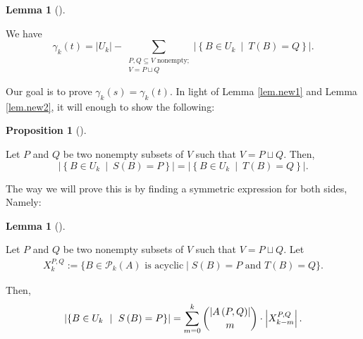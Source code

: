 \documentclass[numbers=enddot,12pt,final,onecolumn,notitlepage]{scrartcl}%
\theoremstyle{definition}
\newtheorem{lem}[theo]{Lemma}
\newenvironment{lemma}[1][]
{\begin{lem}[#1]\begin{leftbar}}
{\end{leftbar}\end{lem}}
\newtheorem{prop}[theo]{Proposition}
\newenvironment{proposition}[1][]
{\begin{prop}[#1]\begin{leftbar}}
{\end{leftbar}\end{prop}}
\let\sumnonlimits\sum
\renewcommand{\sum}{\sumnonlimits\limits}
\theoremstyle{plainsl}
\begin{document}
\begin{lemma}
\label{lem.new2}We have%
\[
\gamma_{k}\left(  t\right)  =\left\vert U_{k}\right\vert -\sum
_{\substack{P,Q\subseteq V\text{ nonempty;}\\V=P\sqcup Q}}\left\vert \left\{
B\in U_{k}\ \mid\ T\left(  B\right)  =Q\right\}  \right\vert .
\]

\end{lemma}

Our goal is to prove $\gamma_{k}\left(  s\right)  =\gamma_{k}\left(  t\right)
$. In light of Lemma \ref{lem.new1} and Lemma \ref{lem.new2}, it will enough
to show the following:

\begin{proposition}
\label{prop.new3}Let $P$ and $Q$ be two nonempty subsets of $V$ such that
$V=P\sqcup Q$. Then,%
\[
\left\vert \left\{  B\in U_{k}\ \mid\ S\left(  B\right)  =P\right\}
\right\vert =\left\vert \left\{  B\in U_{k}\ \mid\ T\left(  B\right)
=Q\right\}  \right\vert .
\]

\end{proposition}

The way we will prove this is by finding a symmetric expression for both
sides, Namely:

\begin{lemma}
\label{lem.new4}Let $P$ and $Q$ be two nonempty subsets of $V$ such that
$V=P\sqcup Q$. Let \begin{align*}
    X_{k}^{P,Q} := \{B \in \mathcal{P}_{k}(A) \text{ is acyclic} \mid S(B) = P \text{ and } T(B) = Q\}.
\end{align*}


Then,%
\[
\left\vert \left\{  B\in U_{k}\ \mid\ S\left(  B\right)  =P\right\}
\right\vert =\sum_{m=0}^{k}\dbinom{\left\vert A\left(  P,Q\right)  \right\vert
}{m}\cdot\left\vert X_{k-m}^{P,Q}\right\vert .
\]

\end{lemma}
\end{document}
